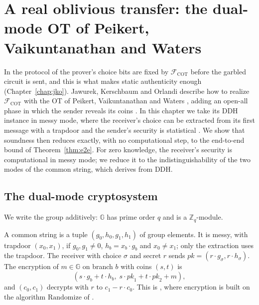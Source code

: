 \chapter{A real oblivious transfer: the dual-mode OT of Peikert, Vaikuntanathan and Waters}
\label{chap:pvw}

In the protocol of \cite{JKO13} the prover's choice bits are fixed by $\mathcal{F}_{\mathrm{COT}}$
before the garbled circuit is sent, and this is what makes static authenticity enough
(Chapter~\ref{chap:jko}). Jawurek, Kerschbaum and Orlandi describe how to realize
$\mathcal{F}_{\mathrm{COT}}$ with the OT of Peikert, Vaikuntanathan and Waters \cite{PVW08}, adding
an open-all phase in which the sender reveals its coins \cite[Appendix~A]{JKO13}. In this chapter we take
its DDH instance \cite[Sect.~5.3]{PVW08} in messy mode, where the receiver's choice can be
extracted from its first message with a trapdoor and the sender's security is statistical
\cite[Theorem~4.1]{PVW08}. We show that soundness then reduces exactly, with no computational step,
to the end-to-end bound of Theorem~\ref{thm:e2e}. For zero knowledge, the receiver's security is
computational in messy mode; we reduce it to the indistinguishability of the two modes of the
common string, which \cite[Theorem~5.2]{PVW08} derives from DDH.

\section{The dual-mode cryptosystem}

We write the group additively: $\mathbb{G}$ has prime order $q$ and is a $\mathbb{Z}_q$-module.

\begin{definition}
  \label{def:pvw}
  \leanok
  A common string is a tuple $(g_0, h_0, g_1, h_1)$ of group elements. It is messy, with trapdoor
  $(x_0, x_1)$, if $g_0, g_1 \neq 0$, $h_b = x_b \cdot g_b$ and $x_0 \neq x_1$; only the
  extraction uses the trapdoor. The receiver with choice
  $\sigma$ and secret $r$ sends $\mathit{pk} = (r \cdot g_\sigma, r \cdot h_\sigma)$. The encryption
  of $m \in \mathbb{G}$ on branch $b$ with coins $(s, t)$ is
  \[ (s \cdot g_b + t \cdot h_b,\; s \cdot \mathit{pk}_1 + t \cdot \mathit{pk}_2 + m), \]
  and $(c_0, c_1)$ decrypts with $r$ to $c_1 - r \cdot c_0$. This is \cite[Sect.~5.3]{PVW08},
  where encryption is built on the algorithm $\mathrm{Randomize}$ of \cite[Lemma~5.1]{PVW08}.
\end{definition}

